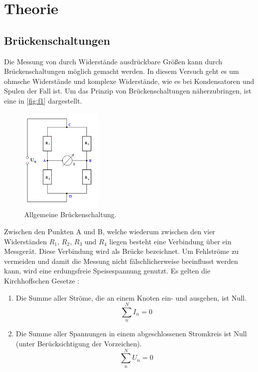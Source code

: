\section{Theorie}
\label{sec:Theorie}

\subsection{Brückenschaltungen}
Die Messung von durch Widerstände ausdrückbare Größen kann durch Brückenschaltungen 
möglich gemacht werden. In diesem Versuch geht es um ohmsche Widerstände
und komplexe Widerstände, wie es bei Kondensatoren und Spulen der Fall ist.
Um das Prinzip von Brückenschaltungen näherzubringen, ist eine in \autoref{fig:f1}
dargestellt.
\begin{figure}[H]
    \centering
        \centering
        \includegraphics[width=0.35\textwidth]{Bilder/Brueckenschaltung.png}
        \caption{Allgemeine Brückenschaltung. \cite{anleitung}}
    \hfill
    \label{fig:f1}
\end{figure}
\noindent Zwischen den Punkten A und B, welche wiederum zwischen den vier Widerständen 
$R_1$, $R_2$, $R_3$ und $R_4$ liegen besteht eine Verbindung über ein Messgerät. 
Diese Verbindung wird als Brücke bezeichnet. Um Fehlströme zu vermeiden und damit 
die Messung nicht fälschlicherweise beeinflusst werden kann, wird eine erdungsfreie 
Speisespannung genutzt. Es gelten die Kirchhoffschen Gesetze \cite{kirchhoff}:
\begin{enumerate}
    \item Die Summe aller Ströme, die an einem Knoten ein- und ausgehen, ist Null.
    \begin{equation}
        \sum\limits_{n}^N I_n = 0
    \end{equation}
    \item Die Summe aller Spannungen in einem abgeschlossenen Stromkreis ist Null 
    (unter Berücksichtigung der Vorzeichen).
    \begin{equation}
        \sum\limits_{n}^N U_n = 0
    \end{equation}
\end{enumerate}
